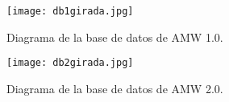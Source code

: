 \clearpage

\begin{figure}
	\centering
	\texttt{[image: db1girada.jpg]}
	\caption{Diagrama de la base de datos de AMW 1.0.}
\end{figure}

\begin{figure}
	\centering
	\texttt{[image: db2girada.jpg]}
	\caption{Diagrama de la base de datos de AMW 2.0.}
\end{figure}

\clearpage